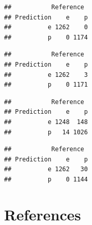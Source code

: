 \documentclass[
  english,
  man]{apa6}
\newenvironment{Shaded}{\begin{snugshade}}{\end{snugshade}}
\newcommand{\KeywordTok}[1]{\textcolor[rgb]{0.13,0.29,0.53}{\textbf{#1}}}
\newcommand{\NormalTok}[1]{#1}
\newcommand{\OperatorTok}[1]{\textcolor[rgb]{0.81,0.36,0.00}{\textbf{#1}}}
\begin{document}
\begin{Shaded}
\end{Shaded}

\begin{verbatim}
##           Reference
## Prediction    e    p
##          e 1262    0
##          p    0 1174
\end{verbatim}

\begin{Shaded}
\end{Shaded}

\begin{verbatim}
##           Reference
## Prediction    e    p
##          e 1262    3
##          p    0 1171
\end{verbatim}

\begin{Shaded}
\end{Shaded}

\begin{verbatim}
##           Reference
## Prediction    e    p
##          e 1248  148
##          p   14 1026
\end{verbatim}

\begin{Shaded}
\end{Shaded}

\begin{verbatim}
##           Reference
## Prediction    e    p
##          e 1262   30
##          p    0 1144
\end{verbatim}

\newpage

\hypertarget{references}{%
\section{References}\label{references}}
\end{document}
